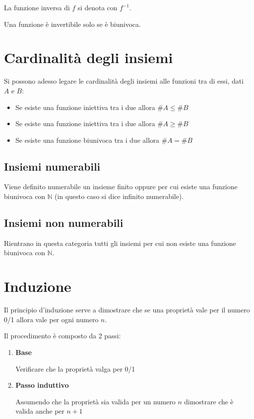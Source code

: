 \documentclass{article}
\begin{document}
\noindent La funzione inversa di $f$ si denota con $\textit{f}^{-1}$.\newline

\noindent Una funzione è invertibile solo se è biunivoca.

\section{Cardinalità degli insiemi}

Si possono adesso legare le cardinalità degli insiemi alle funzioni tra di essi, dati $A$ e $B$:
\begin{itemize}
    \item Se esiste una funzione iniettiva tra i due allora $\#A\leq \#B$
    \item Se esiste una funzione iniettiva tra i due allora $\#A\geq \#B$
    \item Se esiste una funzione biunivoca tra i due allora $\#A= \#B$
\end{itemize}

\subsection{Insiemi numerabili}

Viene definito numerabile un insieme finito oppure per cui esiste una funzione biunivoca con $\mathbb{N}$ (in questo caso si dice infinito numerabile).

\subsection{Insiemi non numerabili}

Rientrano in questa categoria tutti gli insiemi per cui non esiste una funzione biunivoca con $\mathbb{N}$.

\newpage

\section{Induzione}

Il principio d'induzione serve a dimostrare che se una proprietà vale per il numero 0/1 allora vale per ogni numero $n$.\newline

\noindent Il procedimento è composto da 2 passi:
\begin{enumerate}
    \item \textbf{Base} 
    
    Verificare che la proprietà valga per 0/1
    \item \textbf{Passo induttivo} 
    
    Assumendo che la proprietà sia valida per un numero $n$ dimostrare che è valida anche per $n+1$
\end{enumerate}
\end{document}
